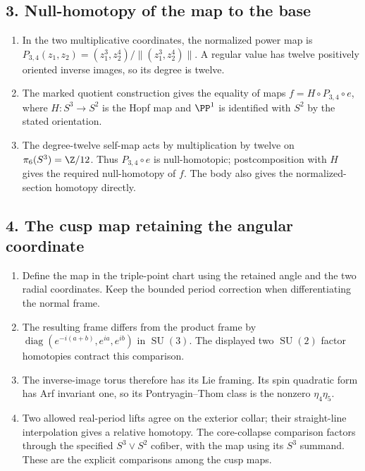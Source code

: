 \subsection*{3. Null-homotopy of the map to the base}
\RungOne
\begin{enumerate}[label=\arabic*.,leftmargin=*]
\item In the two multiplicative coordinates, the normalized power map
is $P_{3,4}(z_1,z_2)=(z_1^3,z_2^4)/\|(z_1^3,z_2^4)\|$.
A regular value has twelve positively oriented inverse images, so its
degree is twelve.
\item The marked quotient construction gives the equality of maps
$f=H\circ P_{3,4}\circ e$, where $H:S^3\to S^2$ is the Hopf
map and $\PP^1$ is identified with $S^2$ by the stated orientation.
\item The degree-twelve self-map acts by multiplication by twelve on
$\pi_6(S^3)=\Z/12$.  Thus $P_{3,4}\circ e$ is null-homotopic;
postcomposition with $H$ gives the required null-homotopy of $f$.
The body also gives the normalized-section homotopy directly.
\end{enumerate}

\subsection*{4. The cusp map retaining the angular coordinate}
\RungOne
\begin{enumerate}[label=\arabic*.,leftmargin=*]
\item Define the map in the triple-point chart using the retained
angle and the two radial coordinates.  Keep the bounded period
correction when differentiating the normal frame.
\item The resulting frame differs from the product frame by
$\operatorname{diag}(e^{-i(a+b)},e^{ia},e^{ib})$ in
$\operatorname{SU}(3)$.  The displayed two $\operatorname{SU}(2)$
factor homotopies contract this comparison.
\item The inverse-image torus therefore has its Lie framing.  Its
spin quadratic form has Arf invariant one, so its Pontryagin--Thom
class is the nonzero $\eta_4\eta_5$.
\item Two allowed real-period lifts agree on the exterior collar;
their straight-line interpolation gives a relative homotopy.
The core-collapse comparison factors through the specified
$S^3\vee S^2$ cofiber, with the map using its $S^3$ summand.
These are the explicit comparisons among the cusp maps.
\end{enumerate}

